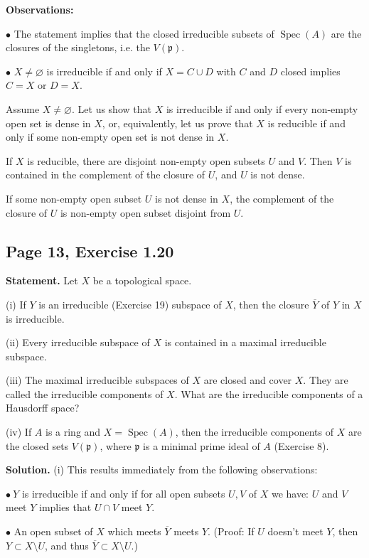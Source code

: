 \documentclass[parskip=half,fontsize=12pt]{scrartcl}%
\newcommand{\mf}{\mathfrak}
\newcommand{\ppp}{\mf p}
\newcommand{\bu}{\bullet}
\newcommand{\Spec}{\operatorname{Spec}}\newcommand{\Sp}{\operatorname{Spec}}
\begin{document}
\textbf{Observations:}

$\bu$ The statement implies that the closed irreducible subsets of $\Spec(A)$ are the closures of the singletons, i.e. the $V(\ppp)$. 

$\bu$ $X\ne\varnothing$ is irreducible if and only if $X=C\cup D$ with $C$ and $D$ closed implies $C=X$ or $D=X$. 

Assume $X\ne\varnothing$. Let us show that $X$ is irreducible if and only if every non-empty open set is dense in $X$, or, equivalently, let us prove that $X$ is reducible if and only if some non-empty open set is not dense in $X$. 

If $X$ is reducible, there are disjoint non-empty open subsets $U$ and $V$. Then $V$ is contained in the complement of the closure of $U$, and $U$ is not dense. 

If some non-empty open subset $U$ is not dense in $X$, the complement of the closure of $U$ is non-empty open subset disjoint from $U$.

\subsection{Page 13, Exercise 1.20}%

\textbf{Statement.} Let $X$ be a topological space.

(i) If $Y$ is an irreducible (Exercise 19) subspace of $X$, then the closure $\overline Y$ of $Y$ in $X$ is irreducible.

(ii) Every irreducible subspace of $X$ is contained in a maximal irreducible subspace.

(iii) The maximal irreducible subspaces of $X$ are closed and cover $X$. They are called the irreducible components of $X$. What are the irreducible components of a Hausdorff space?

(iv) If $A$ is a ring and $X=\Spec(A)$, then the irreducible components of $X$ are the closed sets $V(\ppp)$, where $\ppp$ is a minimal prime ideal of $A$ (Exercise 8).

\textbf{Solution.} (i) This results immediately from the following observations:

$\bu\ Y$ is irreducible if and only if for all open subsets $U,V$ of $X$ we have: $U$ and $V$ meet $Y$ implies that $U\cap V$ meet $Y$.

$\bu$ An open subset of $X$ which meets $\overline Y$ meets $Y$. (Proof: If $U$ doesn't meet $Y$, then $Y\subset X\setminus U$, and thus $\overline Y\subset X\setminus U$.)
\end{document}
